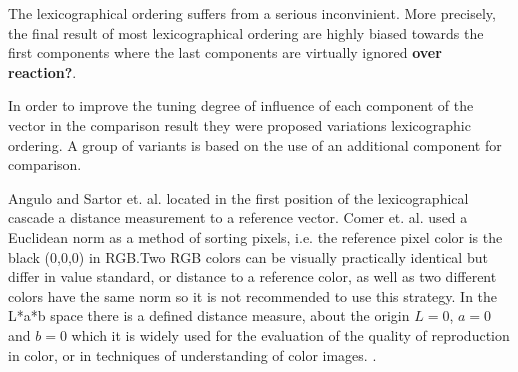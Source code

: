

The lexicographical ordering suffers from a serious inconvinient. More precisely, the final result of most lexicographical ordering are highly biased towards the first components where the last components are virtually ignored \cite{hanbury2002mathematical3} \textbf{over reaction?}.
 
In order to improve the tuning degree of influence of each component of the vector in the comparison result they were proposed variations lexicographic ordering. A group of variants is based on the use of an additional component for comparison.


Angulo \cite{angulo2005morphological} and  Sartor et. al. \cite{sartor2001morphological} located in the first position of the lexicographical cascade a distance measurement to a reference vector. Comer et. al. \cite{comer1999morphological} used a Euclidean norm as a method of sorting pixels, i.e. the reference pixel color is the black (0,0,0) in RGB.Two RGB colors can be visually practically identical but differ in value standard, or distance to a reference color, as well as two different colors have the same norm so it is not recommended to use this strategy. In the L*a*b space there is a defined distance measure, about the origin $L=0$, $a=0$ and $b=0$ which it is widely used for the evaluation of the quality of reproduction in color, or in techniques of understanding of color images. \cite{tremeau1998analyse}.   

